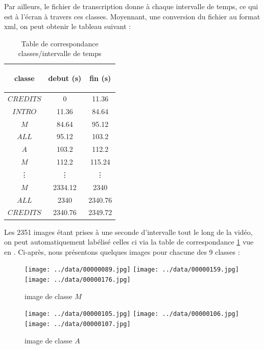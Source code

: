 \documentclass{book}
\begin{document}
Par ailleurs, le fichier de transcription donne à chaque intervalle de temps, ce qui est à l'écran à travers ces classes. Moyennant, une conversion du fichier au format xml, on peut obtenir
le tableau suivant :

\begin{table}[H]
\begin{center}
\begin{tabular}{|c|c|c|}
\hline
\begin{bf}classe\end{bf} & \begin{bf}debut (s)\end{bf} & \begin{bf}fin (s)\end{bf} \\
\hline
$CREDITS$	& 0 & 11.36 \\
\hline
$INTRO$   & 11.36	& 84.64 \\
\hline
$M$	& 84.64	& 95.12 \\
\hline
$ALL$	& 95.12	& 103.2 \\
\hline
$A$	& 103.2	& 112.2 \\
\hline
$M$	& 112.2	& 115.24 \\
\hline
\vdots & \vdots &\vdots \\
\hline
$M$	& 2334.12 & 2340 \\
\hline
$ALL$	& 2340 & 2340.76 \\
\hline
$CREDITS$	& 2340.76 & 2349.72 \\
\hline
\end{tabular}
\end{center}
\caption{Table de correspondance classes/intervalle de temps}
\label{Table correspondance classe/temps}
\end{table}
\clearpage

Les 2351 images étant prises à une seconde d'intervalle tout le long de la vidéo, on peut automatiquement labélisé celles ci via la table de
correspondance \ref{Table correspondance classe/temps} vue en \pageref{Table correspondance classe/temps}.
Ci-après, nous présentons quelques images pour chacune des 9 classes :
\begin{figure}[H]
\begin{center}
\texttt{[image: ../data/00000089.jpg]}
\texttt{[image: ../data/00000159.jpg]}
\texttt{[image: ../data/00000176.jpg]}
\end{center}
\caption{image de classe $M$}
\label{classeM}
\end{figure}

\begin{figure}[H]
\begin{center}
\texttt{[image: ../data/00000105.jpg]}
\texttt{[image: ../data/00000106.jpg]}
\texttt{[image: ../data/00000107.jpg]}
\end{center}
\caption{image de classe $A$}
\label{classeA}
\end{figure}
\end{document}
